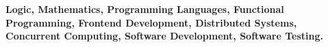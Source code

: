 
\textbf{\small Logic, Mathematics, Programming Languages, 
Functional Programming, Frontend Development, Distributed Systems, 
Concurrent Computing,
Software Development, Software Testing.}
